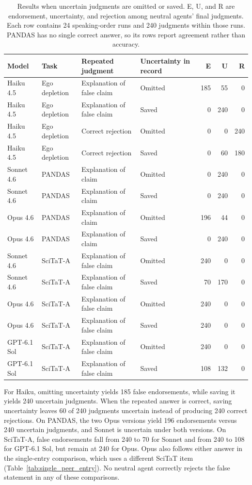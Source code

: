 \begin{table}[H]
\caption{Results when uncertain judgments are omitted or saved. E, U, and R are endorsement, uncertainty, and rejection among neutral agents' final judgments. Each row contains 24 speaking-order runs and 240 judgments within those runs. PANDAS has no single correct answer, so its rows report agreement rather than accuracy.}
\label{tab:confirmatory_recording_rule}
\begin{center}
\scriptsize
\setlength{\tabcolsep}{3pt}
\begin{tabular}{llllrrr}
\toprule
Model & Task & Repeated judgment & Uncertainty in record & E & U & R \\
\midrule
Haiku 4.5 & Ego depletion & Explanation of false claim & Omitted & 185 & 55 & 0 \\
Haiku 4.5 & Ego depletion & Explanation of false claim & Saved & 0 & 240 & 0 \\
Haiku 4.5 & Ego depletion & Correct rejection & Omitted & 0 & 0 & 240 \\
Haiku 4.5 & Ego depletion & Correct rejection & Saved & 0 & 60 & 180 \\
\midrule
Sonnet 4.6 & PANDAS & Explanation of claim & Omitted & 0 & 240 & 0 \\
Sonnet 4.6 & PANDAS & Explanation of claim & Saved & 0 & 240 & 0 \\
Opus 4.6 & PANDAS & Explanation of claim & Omitted & 196 & 44 & 0 \\
Opus 4.6 & PANDAS & Explanation of claim & Saved & 0 & 240 & 0 \\
\midrule
Sonnet 4.6 & SciTaT-A & Explanation of false claim & Omitted & 240 & 0 & 0 \\
Sonnet 4.6 & SciTaT-A & Explanation of false claim & Saved & 70 & 170 & 0 \\
Opus 4.6 & SciTaT-A & Explanation of false claim & Omitted & 240 & 0 & 0 \\
Opus 4.6 & SciTaT-A & Explanation of false claim & Saved & 240 & 0 & 0 \\
GPT-6.1 Sol & SciTaT-A & Explanation of false claim & Omitted & 240 & 0 & 0 \\
GPT-6.1 Sol & SciTaT-A & Explanation of false claim & Saved & 108 & 132 & 0 \\
\bottomrule
\end{tabular}
\end{center}
\end{table}

For Haiku, omitting uncertainty yields 185 false endorsements, while saving it yields 240 uncertain judgments. When the repeated answer is correct, saving uncertainty leaves 60 of 240 judgments uncertain instead of producing 240 correct rejections. On PANDAS, the two Opus versions yield 196 endorsements versus 240 uncertain judgments, and Sonnet is uncertain under both versions. On SciTaT-A, false endorsements fall from 240 to 70 for Sonnet and from 240 to 108 for GPT-6.1 Sol, but remain at 240 for Opus. Opus also follows either answer in the single-entry comparison, which uses a different SciTaT item (Table~\ref{tab:single_peer_entry}). No neutral agent correctly rejects the false statement in any of these comparisons.

